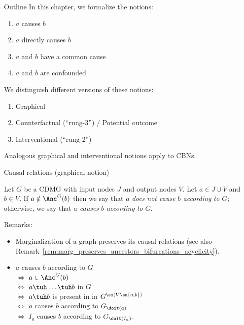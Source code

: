 \begin{frame}{Outline}
  In this chapter, we formalize the notions:
  \begin{enumerate}
    \item $a$ causes $b$
    \item $a$ directly causes $b$
    \item $a$ and $b$ have a common cause
    \item $a$ and $b$ are confounded
  \end{enumerate}

  \bigskip
  We distinguish different versions of these notions:
  \begin{enumerate}
    \item Graphical
    \item Counterfactual (``rung-3'') / Potential outcome
    \item Interventional (``rung-2'')
  \end{enumerate}

  \bigskip
  Analogous graphical and interventional notions apply to CBNs.
\end{frame}


\begin{frame}{Causal relations (graphical notion)}
\begin{Def}[\ref{def:graph_cause_of}]
  Let $G$ be a CDMG with input nodes $J$ and output nodes $V$.
  Let $a \in J \cup V$ and $b \in V$.
  If $a \notin \Anc^G(b)$ then we say that \emph{$a$ does not cause $b$ according to $G$}; otherwise, we say that \emph{$a$ causes $b$ according to $G$}.
\end{Def}

\bigskip
  Remarks:
  \begin{itemize}
    \item Marginalization of a graph preserves its causal relations (see also Remark~\ref{rem:marg_preserves_ancestors_bifurcations_acyclicity}).
    \item $a$ causes $b$ according to $G$ \\
          $\iff$ $a \in \Anc^G(b)$ \\
          $\iff$ $a \tuh \dots \tuh b$ in $G$ \\
          $\iff$ $a \tuh b$ is present in in $G^{\sm(V\sm\{a,b\})}$ \\
          $\iff$ $a$ causes $b$ according to $G_{\doit(a)}$ \\
          $\iff$ $I_a$ causes $b$ according to $G_{\doit(I_a)}$.
  \end{itemize}
\end{frame}

